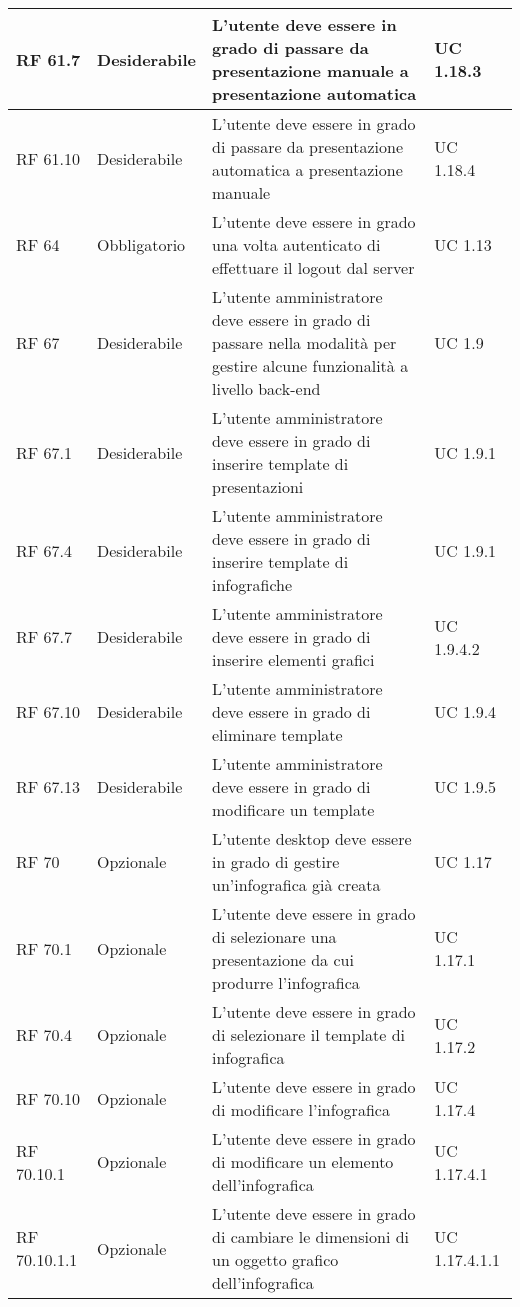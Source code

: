 {\begin{longtable} [c]{| p{2.5cm} | p{2.5cm} | p{6cm} |p{2.5cm}|}
			\hline
			RF 61.7 & Desiderabile & L'utente deve essere in grado di passare da presentazione manuale a presentazione automatica & UC 1.18.3\\
			\hline
			RF 61.10 & Desiderabile & L'utente deve essere in grado di passare da presentazione automatica a presentazione manuale & UC 1.18.4\\
			\hline
			RF 64 & Obbligatorio & L'utente deve essere in grado una volta autenticato di effettuare il logout dal server & UC 1.13\\
			\hline
			RF 67 & Desiderabile & L'utente amministratore deve essere in grado di passare nella modalità per gestire alcune funzionalità a livello back-end & UC 1.9\\
			\hline
			RF 67.1 & Desiderabile & L'utente amministratore deve essere in grado di inserire template di presentazioni & UC 1.9.1\\
			\hline
			RF 67.4 & Desiderabile & L'utente amministratore deve essere in grado di inserire template di infografiche & UC 1.9.1\\
			\hline
			RF 67.7 & Desiderabile & L'utente amministratore deve essere in grado di inserire elementi grafici & UC 1.9.4.2\\
			\hline
			RF 67.10 & Desiderabile & L'utente amministratore deve essere in grado di eliminare template & UC 1.9.4\\
			\hline
			RF 67.13 & Desiderabile & L'utente amministratore deve essere in grado di modificare un template & UC 1.9.5\\
			\hline
			RF 70 & Opzionale & L'utente desktop deve essere in grado di gestire un'infografica già creata & UC 1.17\\
			\hline
			RF 70.1 & Opzionale & L'utente deve essere in grado di selezionare una presentazione da cui produrre l'infografica & UC 1.17.1\\
			\hline
			RF 70.4 & Opzionale & L'utente deve essere in grado di selezionare il template di infografica & UC 1.17.2\\
			\hline
			RF 70.10 & Opzionale & L'utente deve essere in grado di modificare l'infografica & UC 1.17.4\\
			\hline			
			RF 70.10.1 & Opzionale & L'utente deve essere in grado di modificare un elemento dell'infografica & UC 1.17.4.1\\
			\hline
			RF 70.10.1.1 & Opzionale & L'utente deve essere in grado di cambiare le dimensioni di un oggetto grafico dell'infografica & UC 1.17.4.1.1\\

\end{longtable}}
